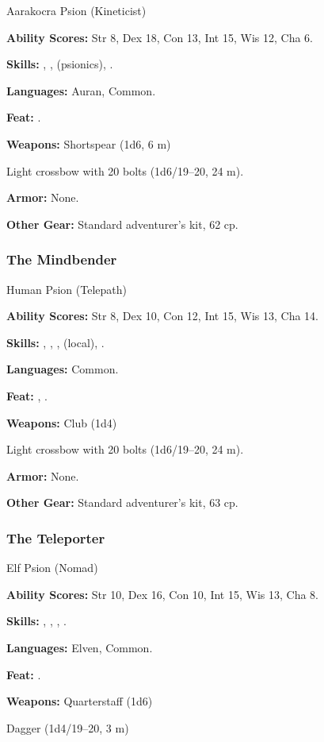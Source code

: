 Aarakocra Psion (Kineticist)

\textbf{Ability Scores:} Str 8, Dex 18, Con 13, Int 15, Wis 12, Cha 6.

\textbf{Skills:} , ,  (psionics), .

\textbf{Languages:} Auran, Common.

\textbf{Feat:} .

\textbf{Weapons:} Shortspear (1d6, 6 m)

Light crossbow with 20 bolts (1d6/19--20, 24 m).

\textbf{Armor:} None.

\textbf{Other Gear:} Standard adventurer's kit, 62 cp.

\subsubsection{The Mindbender}
Human Psion (Telepath)

\textbf{Ability Scores:} Str 8, Dex 10, Con 12, Int 15, Wis 13, Cha 14.

\textbf{Skills:} , , ,  (local), .

\textbf{Languages:} Common.

\textbf{Feat:} , .

\textbf{Weapons:} Club (1d4)

Light crossbow with 20 bolts (1d6/19--20, 24 m).

\textbf{Armor:} None.

\textbf{Other Gear:} Standard adventurer's kit, 63 cp.

\subsubsection{The Teleporter}
Elf Psion (Nomad)

\textbf{Ability Scores:} Str 10, Dex 16, Con 10, Int 15, Wis 13, Cha 8.

\textbf{Skills:} , , , .

\textbf{Languages:} Elven, Common.

\textbf{Feat:} .

\textbf{Weapons:} Quarterstaff (1d6)

Dagger (1d4/19--20, 3 m)

